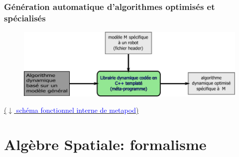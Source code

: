 \documentclass[10pt]{beamer}
\begin{document}
\begin{frame}
  \frametitle{Génération automatique d'algorithmes optimisés et spécialisés}
  
	\begin{figure}[H]
	\begin{center}
	\includegraphics[width=\textwidth]{figs/principeAlgoGenerique.pdf}
	\label{fig_generationAlgoAutomatique}
	\end{center}
	\end{figure}
  
	
	\bigskip
	\href{run:/home/nuno/Documents/Stage/Soutenance/figs/archiMetapod.pdf}
	{($\downarrow$ \textcolor{blue}{schéma fonctionnel interne de metapod})}

\end{frame}


\section{Algèbre Spatiale: formalisme}

\subsection{}

\end{document}
